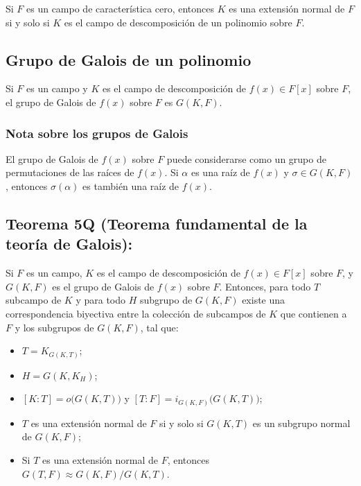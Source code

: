 \documentclass{article}
\begin{document}
Si $F$ es un campo de característica cero, entonces $K$ es una extensión normal de $F$ si y solo si $K$ es el campo de descomposición de un polinomio sobre $F$.

\subsection*{\color{violet} Grupo de Galois de un polinomio}

Si $F$ es un campo y $K$ es el campo de descomposición de $f(x)\in F[x]$ sobre $F$, el grupo de Galois de $f(x)$ sobre $F$ es $G(K,F)$.

\subsubsection*{\color{violet} Nota sobre los grupos de Galois}

El grupo de Galois de $f(x)$ sobre $F$ puede considerarse como un grupo de permutaciones de las raíces de $f(x)$. Si $\alpha$ es una raíz de $f(x)$ y $\sigma\in G(K,F)$, entonces $\sigma(\alpha)$ es también una raíz de $f(x)$.

\subsection*{\color{red} Teorema 5Q (Teorema fundamental de la teoría de Galois):}

Si $F$ es un campo, $K$ es el campo de descomposición de $f(x)\in F[x]$ sobre $F$, y $G(K,F)$ es el grupo de Galois de $f(x)$ sobre $F$. Entonces, para todo $T$ subcampo de $K$ y para todo $H$ subgrupo de $G(K,F)$ existe una correspondencia biyectiva entre la colección de subcampos de $K$ que contienen a $F$ y los subgrupos de $G(K,F)$, tal que:

\begin{itemize}

\item $T=K_{G(K,T)}$;

\item $H=G(K,K_H)$;

\item $[K:T]=o\big(G(K,T)\big)$ y $[T:F]=i_{G(K,F)}\big(G(K,T)\big)$;

\item $T$ es una extensión normal de $F$ si y solo si $G(K,T)$ es un subgrupo normal de $G(K,F)$;

\item Si $T$ es una extensión normal de $F$, entonces $G(T,F)\approx G(K,F)/G(K,T)$.

\end{itemize}
\end{document}
